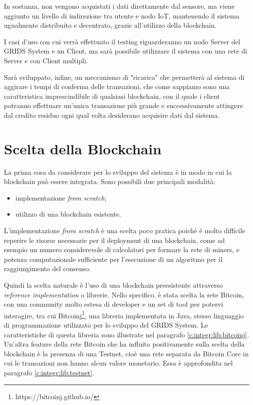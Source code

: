 In sostanza, non vengono acquistati i dati direttamente dal sensore, ma viene aggiunto un livello di indirezione tra utente e nodo IoT, mantenendo il sistema ugualmente distribuito e decentrato, grazie all'utilizzo della blockchain.

I casi d'uso con cui verrà effettuato il testing riguarderanno un nodo Server del GRIDS System e un Client, ma sarà possibile utilizzare il sistema con una rete di Server e con Client multipli.

Sarà sviluppato, infine, un meccanismo di "ricarica" che permetterà al sistema di aggirare i tempi di conferma delle transazioni, che come sappiamo sono una caratteristica imprescindibile di qualsiasi blockchain, con il quale i client potranno effettuare un'unica transazione più grande e successivamente attingere dal credito residuo ogni qual volta desiderano acquisire dati dal sistema.


\section{Scelta della Blockchain}
\label{c:integr:lib}

La prima cosa da considerare per lo sviluppo del sistema è in modo in cui la blockchain può essere integrata. Sono possibili due principali modalità:
\begin{itemize}
    \item implementazione \textit{from scratch};
    \item utilizzo di una blockchain esistente.
\end{itemize}

L'implementazione \textit{from scratch} è una scelta poco pratica poiché è molto difficile reperire le risorse necessarie per il deployment di una blockchain, come ad esempio un numero considerevole di calcolatori per formare la rete di miners, e potenza computazionale sufficiente per l'esecuzione di un algoritmo per il raggiungimento del consenso.

Quindi la scelta naturale è l'uso di una blockchain preesistente attraverso \textit{reference implementation} o librerie. Nello specifico, è stata scelta la rete Bitcoin, con una community molto estesa di developer e un set di tool per potervi interagire, tra cui Bitcoinj\footnote{https://bitcoinj.github.io/}, una libreria implementata in Java, stesso linguaggio di programmazione utilizzato per lo sviluppo del GRIDS System. Le caratteristiche di questa libreria sono illustrate nel paragrafo \ref{c:integr:lib:bitcoinj}.
Un'altra feature della rete Bitcoin che ha influito positivamente sulla scelta della blockchain è la presenza di una Testnet, cioè una rete separata da Bitcoin Core in cui le transazioni non hanno alcun valore monetario. Essa è approfondita nel paragrafo \ref{c:integr:lib:testnet}.


